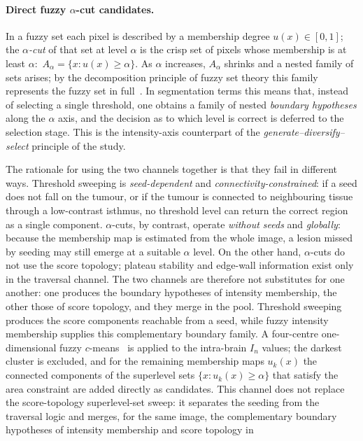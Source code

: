 \documentclass[11pt,a4paper]{article}
\begin{document}
\paragraph{Direct fuzzy $\alpha$-cut candidates.} In a fuzzy set each pixel is
described by a membership degree $u(x)\in[0,1]$; the \emph{$\alpha$-cut} of that
set at level $\alpha$ is the crisp set of pixels whose membership is at least
$\alpha$:\ $A_\alpha=\{x:u(x)\ge\alpha\}$. As $\alpha$ increases, $A_\alpha$
shrinks and a nested family of sets arises; by the decomposition principle of
fuzzy set theory this family represents the fuzzy set in
full~\cite{bezdek1981}. In segmentation terms this means that, instead of
selecting a single threshold, one obtains a family of nested \emph{boundary
hypotheses} along the $\alpha$ axis, and the decision as to which level is correct
is deferred to the selection stage. This is the intensity-axis counterpart of the
\emph{generate--diversify--select} principle of the study.\par The rationale for
using the two channels together is that they fail in different ways. Threshold
sweeping is \emph{seed-dependent} and \emph{connectivity-constrained}: if a seed
does not fall on the tumour, or if the tumour is connected to neighbouring tissue
through a low-contrast isthmus, no threshold level can return the correct region
as a single component. $\alpha$-cuts, by contrast, operate \emph{without seeds}
and \emph{globally}: because the membership map is estimated from the whole image,
a lesion missed by seeding may still emerge at a suitable $\alpha$ level. On the
other hand, $\alpha$-cuts do not use the score topology; plateau stability and
edge-wall information exist only in the traversal channel. The two channels are
therefore not substitutes for one another: one produces the boundary hypotheses of
intensity membership, the other those of score topology, and they merge in the
pool. Threshold sweeping produces the score components reachable from a seed,
while fuzzy intensity membership supplies this complementary boundary family. A
four-centre one-dimensional fuzzy $c$-means~\cite{bezdek1981} is applied to the
intra-brain $I_n$ values; the darkest cluster is excluded, and for the remaining
membership maps $u_k(x)$ the connected components of the superlevel sets
$\{x:u_k(x)\ge\alpha\}$ that satisfy the area constraint are added directly as
candidates. This channel does not replace the score-topology superlevel-set sweep: it separates the
seeding from the traversal logic and merges, for the same image, the
complementary boundary hypotheses of intensity membership and score topology in
\end{document}
